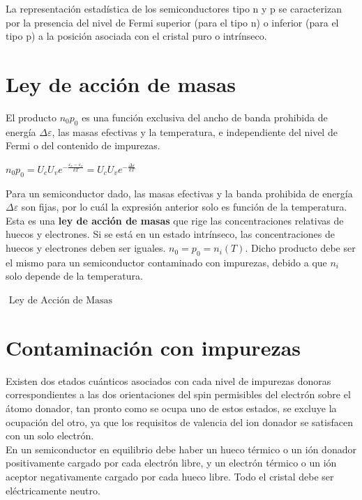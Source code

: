 \documentclass[oneside]{book}
\numberwithin{equation}{section}
\numberwithin{figure}{section}
\numberwithin{table}{section}
\begin{document}
			La representación estadística de los semiconductores tipo n y p se caracterizan por la presencia del nivel de Fermi superior (para el tipo n) o inferior (para el tipo p) a la posición asociada con el cristal puro o intrínseco.\\

		\section{Ley de acción de masas}	
		
			El producto $n_0 p_0$ es una función exclusiva del ancho de banda prohibida de energía $\Delta \varepsilon$, las masas efectivas y la temperatura, e independiente del nivel de Fermi o del contenido de impurezas.
			
			\begin{center}
				$\displaystyle n_0 p_0=U_c U_v e^{-\frac{\varepsilon_c-\varepsilon_v}{kT}}=U_c U_v e^{-\frac{\Delta \varepsilon}{kT}}$
			\end{center}
	
			Para un semiconductor dado, las masas efectivas y la banda prohibida de energía $\Delta \varepsilon$ son fijas, por lo cuál la expresión anterior solo es función de la temperatura. Esta es una \textbf{ley de acción de masas} que rige las concentraciones relativas de huecos y electrones. Si se está en un estado intrínseco, las concentraciones de huecos y electrones deben ser iguales. $n_0=p_0=n_i(T)$. Dicho producto debe ser el mismo para un semiconductor contaminado con impurezas, debido a que $n_i$ solo depende de la temperatura.	
	
			\begin{center}
					 $\text{ Ley de Acción de Masas}$
			\end{center}		
			
		\section{Contaminación con impurezas}
		
			Existen dos etados cuánticos asociados con cada nivel de impurezas donoras correspondientes a las dos orientaciones del spin permisibles del electrón sobre el átomo donador, tan pronto como se ocupa uno de estos estados, se excluye la ocupación del otro, ya que los requisitos de valencia del ion donador se satisfacen con un solo electrón.\\
			
			En un semiconductor en equilibrio debe haber un hueco térmico o un ión donador positivamente cargado por cada electrón libre, y un electrón térmico o un ión aceptor negativamente cargado por cada hueco libre. Todo el cristal debe ser eléctricamente neutro.
			
\end{document}
